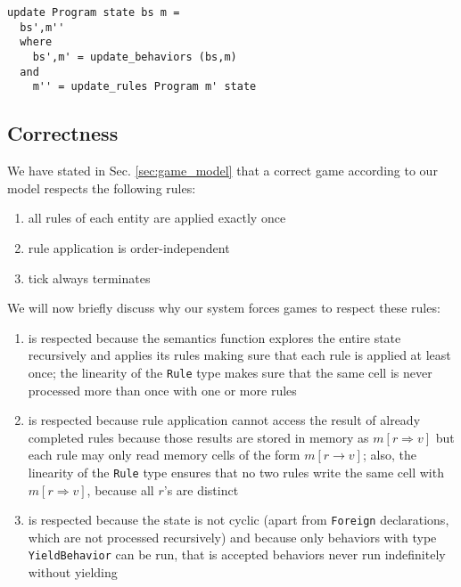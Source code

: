 \begin{lstlisting}
update Program state bs m =
  bs',m''
  where
    bs',m' = update_behaviors (bs,m)
  and
    m'' = update_rules Program m' state
\end{lstlisting}


\subsection{Correctness}
We have stated in Sec. \ref{sec:game_model} that a correct game according to our model respects the following rules:
\begin{enumerate}
\item all rules of each entity are applied exactly once
\item rule application is order-independent
\item tick always terminates
\end{enumerate}

We will now briefly discuss why our system forces games to respect these rules:
\begin{enumerate}
\item is respected because the semantics function explores the entire state recursively and applies its rules making sure that each rule is applied at least once; the linearity of the \texttt{Rule} type makes sure that the same cell is never processed more than once with one or more rules
\item is respected because rule application cannot access the result of already completed rules because those results are stored in memory as $m[r \Rightarrow v]$ but each rule may only read memory cells of the form $m[r \rightarrow v]$; also, the linearity of the \texttt{Rule} type ensures that no two rules write the same cell with $m[r \Rightarrow v]$, because all $r$'s are distinct
\item is respected because the state is not cyclic (apart from \texttt{Foreign} declarations, which are not processed recursively) and because only behaviors with type \texttt{YieldBehavior} can be run, that is accepted behaviors never run indefinitely without yielding
\end{enumerate}

